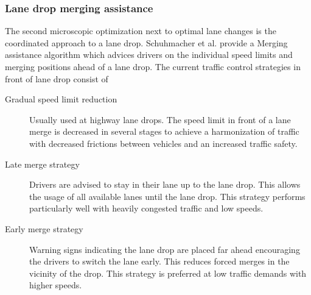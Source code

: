 \documentclass{sig-alternate}
\begin{document}
\subsubsection{Lane drop merging assistance}
\label{lanedrop}
The second microscopic optimization next to optimal lane changes is the coordinated approach to a lane drop. Schuhmacher et al.\cite{1614269.1614274} provide a Merging assistance algorithm which advices drivers on the individual speed limits and merging positions ahead of a lane drop. The current traffic control strategies in front of lane drop consist of
\begin{description}
\item[Gradual speed limit reduction] Usually used at highway lane drops. The speed limit in front of a lane merge is decreased in several stages to achieve a harmonization of traffic with decreased frictions between vehicles and an increased traffic safety.
\item[Late merge strategy] Drivers are advised to stay in their lane up to the lane drop. This allows the usage of all available lanes until the lane drop. This strategy performs particularly well with heavily congested traffic and low speeds. 
\item [Early merge strategy] Warning signs indicating the lane drop are placed far ahead encouraging the drivers to switch the lane early. This reduces forced merges in the vicinity of the drop. This strategy is preferred at low traffic demands with higher speeds.  
\end{description} 
\end{document}
